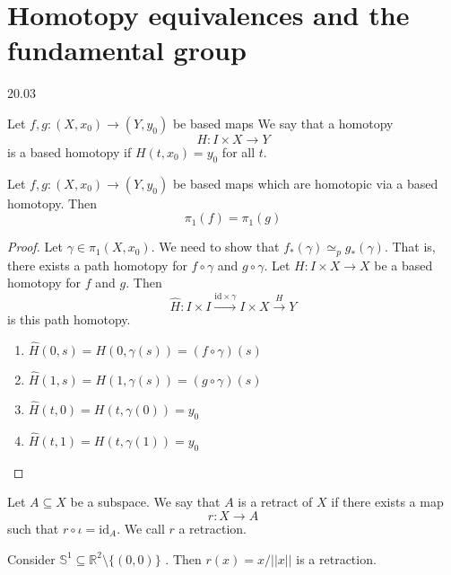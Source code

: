 \section{Homotopy equivalences and the fundamental group}
20.03

\begin{definition}
    Let \( f,g: (X, x_0) \to (Y, y_0) \) be based maps
    We say that a homotopy
    \[
      H: I \times X \to Y
    \]
    is a based homotopy if \( H(t, x_0) = y_0 \)
    for all \( t \).
\end{definition}

\begin{lemma}
  \label{lma:based_maps_homotopic}
    Let \( f, g: (X, x_0) \to (Y, y_0) \)
    be based maps which are homotopic via
    a based homotopy. Then
    \[
      \pi_1 (f) = \pi_1(g)
    \]
\end{lemma}

\begin{proof}
    Let \( \gamma \in \pi_1(X, x_0) \).
    We need to show that \( f_*(\gamma) \simeq_p g_*(\gamma) \).
    That is, there exists a path homotopy
    for \( f \circ \gamma \) and \( g \circ \gamma \).
    Let \( H: I \times X \to X \) be a based homotopy
    for \( f \) and \( g \).
    Then
    \[
      \hat{H}: I \times I \xrightarrow{\text{id} \times \gamma}
      I \times X \xrightarrow{H} Y
    \]
    is this path homotopy.
    \begin{enumerate}
      \item \( \hat{H}(0, s) = H(0, \gamma(s)) = (f \circ \gamma) (s) \)
      \item \( \hat{H}(1, s) = H(1, \gamma(s)) = (g \circ \gamma) (s) \)
      \item \( \hat{H}(t, 0) = H(t, \gamma(0)) = y_0 \)
      \item \( \hat{H}(t, 1) = H(t, \gamma(1)) = y_0 \)
    \end{enumerate}
\end{proof}

\begin{definition}
   Let \( A \subseteq X \) be a subspace.
   We say that \( A \) is a retract of \( X \)
   if there exists a map
   \[
    r: X \to A
   \]
   such that \( r \circ \iota = \text{id}_A \).
   We call \( r \) a retraction.
\end{definition}


\begin{example}
   Consider \( \mathbb{S}^1 \subseteq \mathbb{R}^2 \setminus \{ (0, 0) \}  \) .
   Then \( r(x) = x / \lvert \lvert x \rvert \rvert \) is a retraction.
\end{example}

